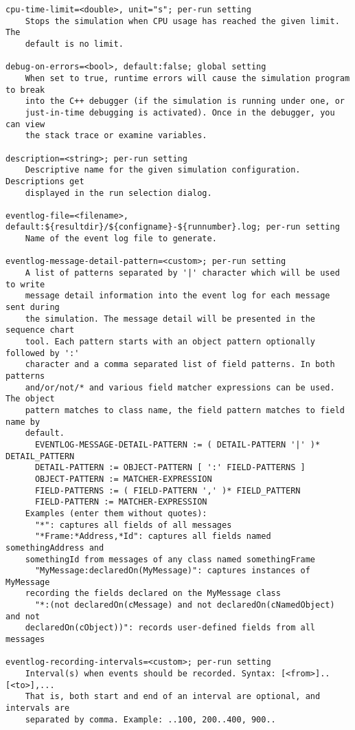 \begin{verbatim}
cpu-time-limit=<double>, unit="s"; per-run setting
    Stops the simulation when CPU usage has reached the given limit. The
    default is no limit.

debug-on-errors=<bool>, default:false; global setting
    When set to true, runtime errors will cause the simulation program to break
    into the C++ debugger (if the simulation is running under one, or
    just-in-time debugging is activated). Once in the debugger, you can view
    the stack trace or examine variables.

description=<string>; per-run setting
    Descriptive name for the given simulation configuration. Descriptions get
    displayed in the run selection dialog.

eventlog-file=<filename>, default:${resultdir}/${configname}-${runnumber}.log; per-run setting
    Name of the event log file to generate.

eventlog-message-detail-pattern=<custom>; per-run setting
    A list of patterns separated by '|' character which will be used to write
    message detail information into the event log for each message sent during
    the simulation. The message detail will be presented in the sequence chart
    tool. Each pattern starts with an object pattern optionally followed by ':'
    character and a comma separated list of field patterns. In both patterns
    and/or/not/* and various field matcher expressions can be used. The object
    pattern matches to class name, the field pattern matches to field name by
    default.
      EVENTLOG-MESSAGE-DETAIL-PATTERN := ( DETAIL-PATTERN '|' )* DETAIL_PATTERN
      DETAIL-PATTERN := OBJECT-PATTERN [ ':' FIELD-PATTERNS ]
      OBJECT-PATTERN := MATCHER-EXPRESSION
      FIELD-PATTERNS := ( FIELD-PATTERN ',' )* FIELD_PATTERN
      FIELD-PATTERN := MATCHER-EXPRESSION
    Examples (enter them without quotes):
      "*": captures all fields of all messages
      "*Frame:*Address,*Id": captures all fields named somethingAddress and
    somethingId from messages of any class named somethingFrame
      "MyMessage:declaredOn(MyMessage)": captures instances of MyMessage
    recording the fields declared on the MyMessage class
      "*:(not declaredOn(cMessage) and not declaredOn(cNamedObject) and not
    declaredOn(cObject))": records user-defined fields from all messages

eventlog-recording-intervals=<custom>; per-run setting
    Interval(s) when events should be recorded. Syntax: [<from>]..[<to>],...
    That is, both start and end of an interval are optional, and intervals are
    separated by comma. Example: ..100, 200..400, 900..


\end{verbatim}
